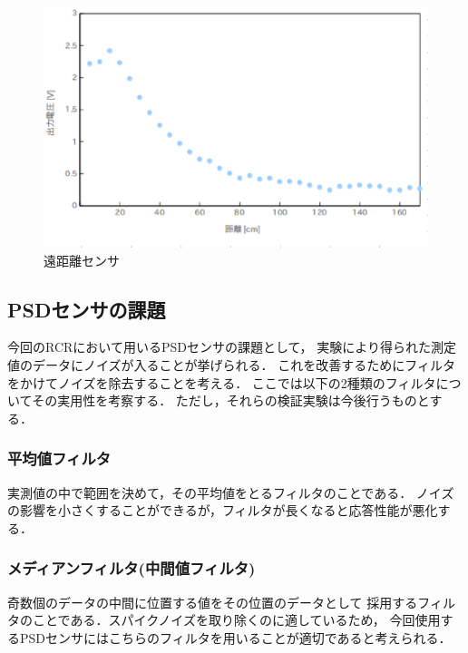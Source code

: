 \documentclass[10pt,a4j]{jarticle}
\begin{document}
\begin{figure}[H]
  \begin{center}
    \includegraphics[width=1.0\hsize]{picture/psdf.eps}
    \caption{遠距離センサ}
    \label{psdf}
  \end{center}
\end{figure}


\newpage
\subsection{PSDセンサの課題}
今回のRCRにおいて用いるPSDセンサの課題として，
実験により得られた測定値のデータにノイズが入ることが挙げられる．
これを改善するためにフィルタをかけてノイズを除去することを考える．
ここでは以下の2種類のフィルタについてその実用性を考察する．
ただし，それらの検証実験は今後行うものとする．

\subsubsection{平均値フィルタ}
実測値の中で範囲を決めて，その平均値をとるフィルタのことである．
ノイズの影響を小さくすることができるが，フィルタが長くなると応答性能が悪化する．

\subsubsection{メディアンフィルタ(中間値フィルタ)}
奇数個のデータの中間に位置する値をその位置のデータとして
採用するフィルタのことである．スパイクノイズを取り除くのに適しているため，
今回使用するPSDセンサにはこちらのフィルタを用いることが適切であると考えられる．



\end{document}
